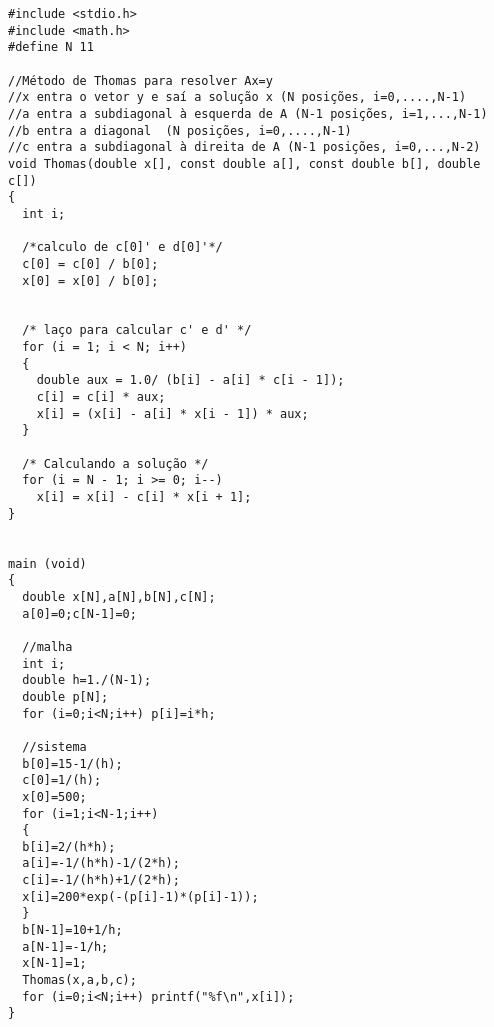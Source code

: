 \begin{verbatim}
#include <stdio.h>
#include <math.h>
#define N 11

//Método de Thomas para resolver Ax=y
//x entra o vetor y e saí a solução x (N posições, i=0,....,N-1)
//a entra a subdiagonal à esquerda de A (N-1 posições, i=1,...,N-1)
//b entra a diagonal  (N posições, i=0,....,N-1)
//c entra a subdiagonal à direita de A (N-1 posições, i=0,...,N-2)
void Thomas(double x[], const double a[], const double b[], double c[]) 
{
  int i;

  /*calculo de c[0]' e d[0]'*/
  c[0] = c[0] / b[0];
  x[0] = x[0] / b[0];


  /* laço para calcular c' e d' */
  for (i = 1; i < N; i++) 
  {
    double aux = 1.0/ (b[i] - a[i] * c[i - 1]);
    c[i] = c[i] * aux;
    x[i] = (x[i] - a[i] * x[i - 1]) * aux;
  }

  /* Calculando a solução */
  for (i = N - 1; i >= 0; i--)
    x[i] = x[i] - c[i] * x[i + 1];
}


main (void)
{
  double x[N],a[N],b[N],c[N];
  a[0]=0;c[N-1]=0;

  //malha
  int i;
  double h=1./(N-1);
  double p[N];
  for (i=0;i<N;i++) p[i]=i*h;
  
  //sistema
  b[0]=15-1/(h);
  c[0]=1/(h);
  x[0]=500;
  for (i=1;i<N-1;i++)
  {
  b[i]=2/(h*h);
  a[i]=-1/(h*h)-1/(2*h);
  c[i]=-1/(h*h)+1/(2*h);
  x[i]=200*exp(-(p[i]-1)*(p[i]-1));
  }
  b[N-1]=10+1/h;
  a[N-1]=-1/h;
  x[N-1]=1;
  Thomas(x,a,b,c);
  for (i=0;i<N;i++) printf("%f\n",x[i]);
}
\end{verbatim}



